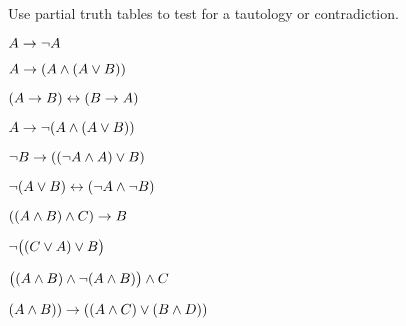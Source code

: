 \documentclass[PHIL101-Textbook.tex]{subfiles}
\begin{document}
\noindent\problempart
\label{pr.TT.TTorC3}
Use partial truth tables to test for a tautology or contradiction. 

\begin{earg}
\item  $A \rightarrow \neg A$ \vspace{.5ex}      	
\item $A \rightarrow (A \land (A \vee B))$ \vspace{.5ex}	
\item $(A \rightarrow B) \leftrightarrow (B \rightarrow A)$ 	\vspace{.5ex}    %
\item $A \rightarrow \neg(A \land (A \vee B)) $	\vspace{.5ex}	
\item $\neg B \rightarrow ((\neg A \land A) \vee B)$\vspace{.5ex} 
\item $\neg(A \vee B) \leftrightarrow (\neg A \land \neg B)$ \vspace{.5ex}
\item $((A \land B) \land C) \rightarrow B$\vspace{.5ex}      	
\item $\neg\bigl((C\vee A) \vee B\bigr)$\vspace{.5ex}       
\item $\bigl((A\land B) \land\neg(A\land B)\bigr) \land C$ \vspace{.5ex}	
\item $(A \land B) )\rightarrow((A \land C) \vee (B \land D))$ \vspace{.5ex}  

\end{earg}
\end{document}
